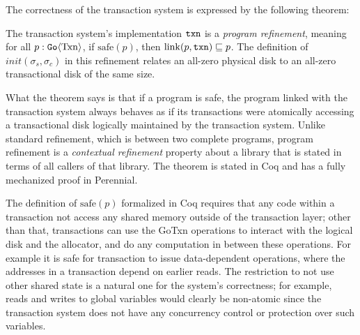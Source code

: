 %

The correctness of the transaction system is expressed by the following theorem:
%
\begin{theorem}
  The transaction system's implementation $\texttt{txn}$ is a \emph{program refinement}, meaning for
  all $p : \mathtt{Go}\langle \mathrm{Txn} \rangle$, if $\mathrm{safe}(p)$, then
  $\mathrm{link}(p, \texttt{txn}) \sqsubseteq p$. The definition of
  $init(\sigma_{s}, \sigma_{c})$ in this refinement relates an all-zero physical
  disk to an all-zero transactional disk of the same size.
  \label{thm:gotxn-program-refinement}
\end{theorem}
%
What the theorem says is that if a program is safe, the program linked with the
transaction system always behaves as if its transactions were atomically
accessing a transactional disk logically maintained by the transaction system.
Unlike standard refinement, which is between two complete programs, program
refinement is a \emph{contextual refinement} property about a library that is
stated in terms of all callers of that library.
The theorem is stated in Coq and has a fully mechanized proof in Perennial.

The definition of $\mathrm{safe}(p)$ formalized in Coq requires that any code
within a transaction not access any shared memory outside of the transaction
layer; other than that, transactions can use the GoTxn operations to interact
with the logical disk and the allocator, and do any computation in between these
operations. For example it is safe for transaction to issue data-dependent
operations, where the addresses in a transaction depend on earlier reads. The
restriction to not use other shared state is a natural one for the system's
correctness; for example, reads and writes to global variables would clearly be
non-atomic since the transaction system does not have any concurrency control or
protection over such variables.

